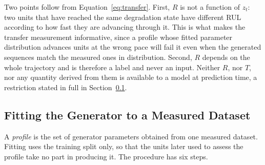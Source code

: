 \documentclass{article}
\begin{document}
Two points follow from Equation~\ref{eq:transfer}. First, $R$ is not a function of $z_t$: two units that have reached the same degradation state have different RUL according to how fast they are advancing through it. This is what makes the transfer measurement informative, since a profile whose fitted parameter distribution advances units at the wrong pace will fail it even when the generated sequences match the measured ones in distribution. Second, $R$ depends on the whole trajectory and is therefore a label and never an input. Neither $R$, nor $T$, nor any quantity derived from them is available to a model at prediction time, a restriction stated in full in Section~\ref{sec:calibration}.
 
\subsection{Fitting the Generator to a Measured Dataset}
\label{sec:calibration}
 
A \emph{profile} is the set of generator parameters obtained from one measured dataset. Fitting uses the training split only, so that the units later used to assess the profile take no part in producing it. The procedure has six steps.
 
\end{document}
